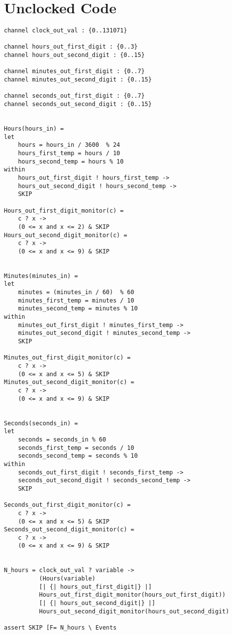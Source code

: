 \section*{Unclocked \cspm{} Code}
\begin{verbatim}
channel clock_out_val : {0..131071}

channel hours_out_first_digit : {0..3}
channel hours_out_second_digit : {0..15}

channel minutes_out_first_digit : {0..7}
channel minutes_out_second_digit : {0..15}

channel seconds_out_first_digit : {0..7}
channel seconds_out_second_digit : {0..15}


Hours(hours_in) =
let
    hours = hours_in / 3600  % 24
    hours_first_temp = hours / 10
    hours_second_temp = hours % 10
within
    hours_out_first_digit ! hours_first_temp ->
    hours_out_second_digit ! hours_second_temp ->
    SKIP

Hours_out_first_digit_monitor(c) =
    c ? x ->
    (0 <= x and x <= 2) & SKIP
Hours_out_second_digit_monitor(c) =
    c ? x ->
    (0 <= x and x <= 9) & SKIP


Minutes(minutes_in) =
let
    minutes = (minutes_in / 60)  % 60
    minutes_first_temp = minutes / 10
    minutes_second_temp = minutes % 10
within
    minutes_out_first_digit ! minutes_first_temp ->
    minutes_out_second_digit ! minutes_second_temp ->
    SKIP

Minutes_out_first_digit_monitor(c) =
    c ? x ->
    (0 <= x and x <= 5) & SKIP
Minutes_out_second_digit_monitor(c) =
    c ? x ->
    (0 <= x and x <= 9) & SKIP


Seconds(seconds_in) =
let
    seconds = seconds_in % 60
    seconds_first_temp = seconds / 10
    seconds_second_temp = seconds % 10
within
    seconds_out_first_digit ! seconds_first_temp ->
    seconds_out_second_digit ! seconds_second_temp ->
    SKIP

Seconds_out_first_digit_monitor(c) =
    c ? x ->
    (0 <= x and x <= 5) & SKIP
Seconds_out_second_digit_monitor(c) =
    c ? x ->
    (0 <= x and x <= 9) & SKIP


N_hours = clock_out_val ? variable ->
          (Hours(variable)
          [| {| hours_out_first_digit|} |]
          Hours_out_first_digit_monitor(hours_out_first_digit))
          [| {| hours_out_second_digit|} |]
          Hours_out_second_digit_monitor(hours_out_second_digit)

assert SKIP [F= N_hours \ Events



\end{verbatim}
